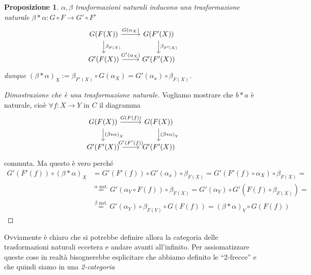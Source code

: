 \documentclass[notitlepage]{report}
\newcounter{theo}[section]\setcounter{theo}{0}
\numberwithin{equation}{section}
\theoremstyle{plain}
\newtheorem{proposition}[theo]{Proposizione}
\theoremstyle{definition}
\theoremstyle{remark}
\begin{document}
\begin{proposition}{}
\(\alpha, \beta\) trasformazioni naturali inducono una trasformazione naturale
\(\beta * \alpha : G \circ F \to G' \circ F'\) 
\[\begin{tikzcd}
	{G{(F{(X)})}} & {G{(F'{(X)})}} \\
    {G'{(F{(X)})}} & {G'{(F'{(X)})}}
	\arrow["G{(\alpha_X)}", from=1-1, to=1-2]
	\arrow["\beta_{F{(X)}}  ", from=1-1, to=2-1]
	\arrow["\beta_{F'{(X)}} ", from=1-2, to=2-2]
	\arrow["G'{(\alpha_X)}", from=2-1, to=2-2]
\end{tikzcd}\]
dunque \((\beta * \alpha)_X := \beta_{F'{(X)}} \circ G{(\alpha_X)} = G'{(\alpha_x)} \circ \beta_{F{(X)}} \).
\end{proposition}
\begin{proof}[Dimostrazione che è una trasformazione naturale]
Vogliamo mostrare che \(b * a\) è naturale, cioè \(\forall f : X \to Y\) in \(C\) il diagramma
\[\begin{tikzcd}
	{G{(F{(X)})}} & {G{(F{(X)})}} \\
    {G'{(F'{(X)})}} & {G'{(F'{(X)})}}
	\arrow["G{(F{(f)})}", from=1-1, to=1-2]
	\arrow["{(\beta * \alpha)}_X", from=1-1, to=2-1]
	\arrow["{(\beta * \alpha)}_Y", from=1-2, to=2-2]
	\arrow["G'{(F'{(f)})}", from=2-1, to=2-2]
\end{tikzcd}\]
commuta. Ma questo è vero perché
\begin{align*}
    G'{(F'{(f)})} \circ {(\beta * \alpha)}_X &= G'{(F'{(f)})} \circ G'{(\alpha_x)}
  \circ \beta_{F{(X)}} = G'{(F'{(f)} \circ \alpha_X)} \circ \beta_{F{(X)}} = \\
    &\overset{\alpha \text{ nat.}}{=} G'{(\alpha_Y \circ F{(f)})} \circ
    \beta_{F{(X)}} = G'{(\alpha_Y)} \circ G'{(F{(f)} \circ \beta_{F{(X)}})} = \\
    &\overset{\beta \text{ nat.}}{=} G'{(\alpha_Y)} \circ \beta_{F{(Y)}}
    \circ G{(F{(f)})} = {(\beta * \alpha)}_Y \circ G{(F{(f)})}
\end{align*}
\end{proof}

Ovviamente è chiaro che si potrebbe definire allora la categoria delle
trasformazioni naturali eccetera e andare avanti all'infinito. Per
assiomatizzare queste cose in realtà bisognerebbe esplicitare che abbiamo
definito le ``2-frecce'' e che quindi siamo in una \emph{2-categoria}
\end{document}
